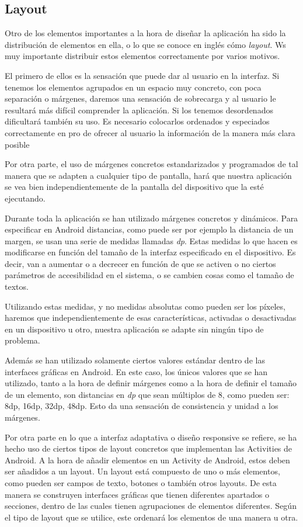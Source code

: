 \subsection{Layout}

Otro de los elementos importantes a la hora de diseñar la aplicación ha sido la distribución de elementos en ella, o lo que se conoce en inglés cómo \textit{layout}. Ws muy importante distribuir estos elementos correctamente por varios motivos.

El primero de ellos es la sensación que puede dar al usuario en la interfaz. Si tenemos los elementos agrupados en un espacio muy concreto, con poca separación o márgenes, daremos una sensación de  sobrecarga y al usuario le resultará más difícil comprender la aplicación. Si los tenemos desordenados dificultará también su uso. Es necesario colocarlos ordenados y especiados correctamente en pro de ofrecer al usuario la información de la manera más clara posible

Por otra parte, el uso de márgenes concretos estandarizados y programados de tal manera que se adapten a cualquier tipo de pantalla, hará que nuestra aplicación se vea bien independientemente de la pantalla del dispositivo que la esté ejecutando.

Durante toda la aplicación se han utilizado márgenes concretos y dinámicos. Para especificar en Android distancias, como puede ser por ejemplo la distancia de un margen,  se usan una serie de medidas llamadas \textit{dp}. Estas medidas lo que hacen es modificarse en función del tamaño de la interfaz especificado en el dispositivo. Es decir, van a aumentar o a decrecer en función de que se activen o no ciertos parámetros de accesibilidad en el sistema, o se cambien cosas como el tamaño de textos.

Utilizando estas medidas, y no medidas absolutas como pueden ser los píxeles, haremos que independientemente de esas características, activadas o desactivadas en un dispositivo u otro, nuestra aplicación se adapte sin ningún tipo de problema.

Además se han utilizado solamente ciertos valores estándar dentro de las interfaces gráficas en Android. En este caso, los únicos valores que se han utilizado, tanto a la hora de definir márgenes como a la hora de definir el tamaño de un elemento, son distancias en \textit{dp} que sean múltiplos de 8, como pueden ser: 8dp, 16dp, 32dp, 48dp. Esto da una sensación de consistencia y unidad a los márgenes.

Por otra parte en lo que a interfaz adaptativa o diseño responsive se refiere, se ha hecho uso de ciertos tipos de layout concretos que implementan las Activities de Android. A la hora de añadir elementos en un Activity de Android, estos deben ser añadidos a un layout. Un layout está compuesto de uno o más elementos, como pueden ser campos de texto, botones o también otros layouts. De esta manera se construyen interfaces gráficas que tienen diferentes apartados o secciones, dentro de las cuales tienen agrupaciones de elementos diferentes. Según el tipo de layout que se utilice, este ordenará los elementos de una manera u otra.

